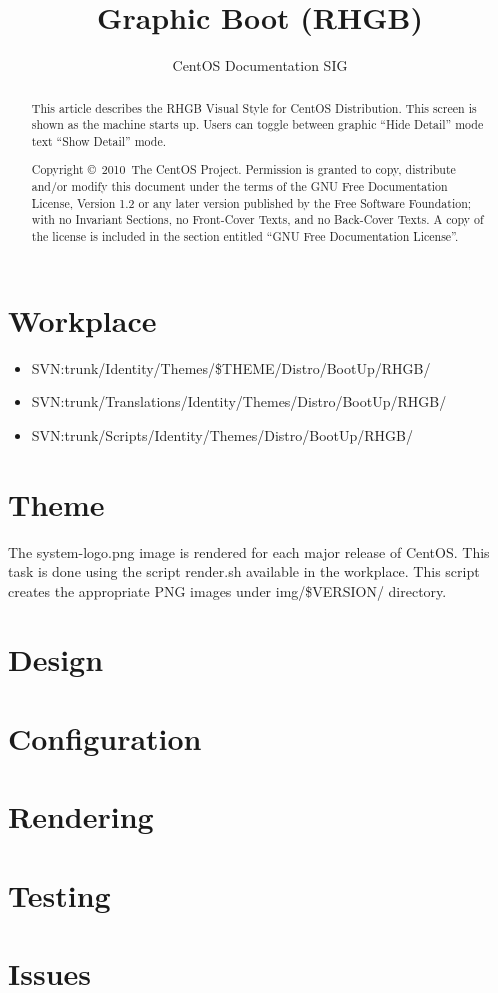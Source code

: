 \documentclass{article}
\title{Graphic Boot (RHGB)}
\author{CentOS Documentation SIG}
\begin{document}
\maketitle

\begin{abstract} 

This article describes the RHGB Visual Style for CentOS Distribution.
This screen is shown as the machine starts up. Users can toggle
between graphic ``Hide Detail'' mode text ``Show Detail'' mode.

Copyright \copyright\ 2010\ The CentOS Project. Permission is
granted to copy, distribute and/or modify this document under the
terms of the GNU Free Documentation License, Version 1.2 or any later
version published by the Free Software Foundation; with no Invariant
Sections, no Front-Cover Texts, and no Back-Cover Texts. A copy of the
license is included in the section entitled ``GNU Free Documentation
License''.  
\end{abstract}

\tableofcontents

\section{Workplace}

\begin{itemize}
\item SVN:trunk/Identity/Themes/\$THEME/Distro/BootUp/RHGB/
\item SVN:trunk/Translations/Identity/Themes/Distro/BootUp/RHGB/
\item SVN:trunk/Scripts/Identity/Themes/Distro/BootUp/RHGB/
\end{itemize}

\section{Theme}



The system-logo.png image is rendered for each major release of
CentOS. This task is done using the script render.sh available in the
workplace.  This script creates the appropriate PNG images under
img/\$VERSION/ directory. 

\section{Design}
\section{Configuration}
\section{Rendering}
\section{Testing}
\section{Issues}


\end{document}
